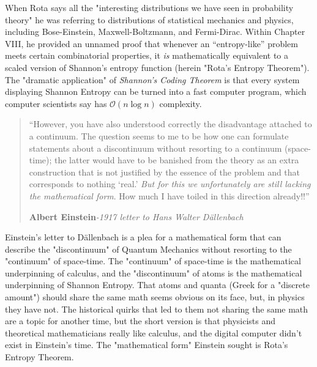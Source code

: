 \documentclass{report}
\begin{document}
When Rota says all the "interesting distributions we have seen in probability theory" he was referring to distributions of statistical mechanics and physics, including Bose-Einstein, Maxwell-Boltzmann, and Fermi-Dirac. Within Chapter VIII, he provided an unnamed proof that whenever an “entropy-like” problem meets certain combinatorial properties, it \emph{is} mathematically equivalent to a scaled version of Shannon’s entropy function (herein "Rota's Entropy Theorem"). The "dramatic application" of \emph{Shannon’s Coding Theorem} is that every system displaying Shannon Entropy can be turned into a fast computer program, which computer scientists say has \(\mathcal{O}(n \log n)\) complexity.

\begin{quote}
    
    “However, you have also understood correctly the disadvantage attached to a continuum. The question seems to me to be how one can formulate statements about a discontinuum without resorting to a continuum (space-time); the latter would have to be banished from the theory as an extra construction that is not justified by the essence of the problem and that corresponds to nothing ‘real.’ \textit{But for this we unfortunately are still lacking the mathematical form}. How much I have toiled in this direction already!!”
    
    \textbf{Albert Einstein}\textit{-1917 letter to Hans Walter Dällenbach}\cite{Einstein314}
    \end{quote}

Einstein's letter to Dällenbach is a plea for a mathematical form that can describe the "discontinuum" of Quantum Mechanics without resorting to the "continuum" of space-time. The "continuum" of space-time is the mathematical underpinning of calculus, and the "discontinuum" of atoms is the mathematical underpinning of Shannon Entropy. That atoms and quanta (Greek for a "discrete amount") should share the same math seems obvious on its face, but, in physics they have not. The historical quirks that led to them not sharing the same math are a topic for another time, but the short version is that physicists and theoretical mathematicians really like calculus, and the digital computer didn't exist in Einstein's time. The "mathematical form" Einstein sought is Rota's Entropy Theorem.
\end{document}
